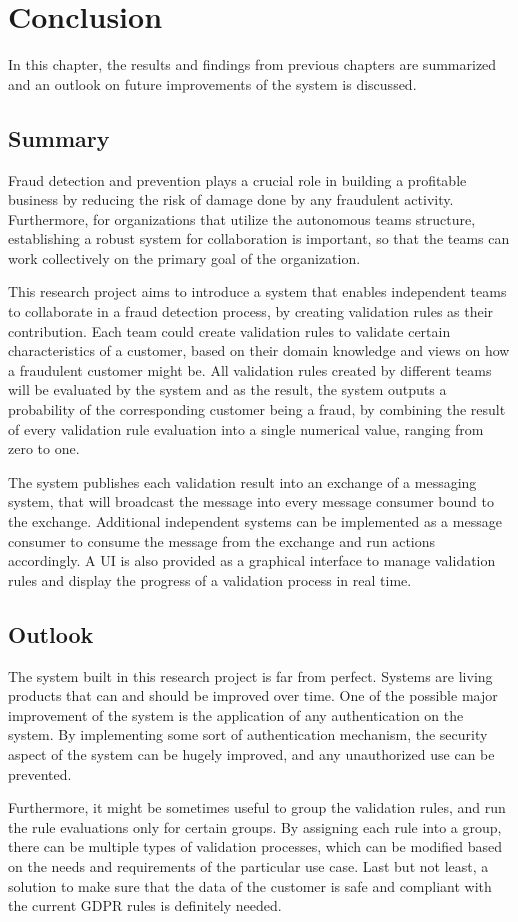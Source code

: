 \chapter{Conclusion}

  In this chapter, the results and findings from previous chapters are summarized and an outlook on future improvements of the system is discussed.

  \section{Summary}

    Fraud detection and prevention plays a crucial role in building a profitable business by reducing the risk of damage done by any fraudulent activity. Furthermore, for organizations that utilize the autonomous teams structure, establishing a robust system for collaboration is important, so that the teams can work collectively on the primary goal of the organization.

    This research project aims to introduce a system that enables independent teams to collaborate in a fraud detection process, by creating validation rules as their contribution. Each team could create validation rules to validate certain characteristics of a customer, based on their domain knowledge and views on how a fraudulent customer might be. All validation rules created by different teams will be evaluated by the system and as the result, the system outputs a probability of the corresponding customer being a fraud, by combining the result of every validation rule evaluation into a single numerical value, ranging from zero to one. 
    
    The system publishes each validation result into an exchange of a messaging system, that will broadcast the message into every message consumer bound to the exchange. Additional independent systems can be implemented as a message consumer to consume the message from the exchange and run actions accordingly. A UI is also provided as a  graphical interface to manage validation rules and display the progress of a validation process in real time. 
  
  \section{Outlook}

    The system built in this research project is far from perfect. Systems are living products that can and should be improved over time. One of the possible major improvement of the system is the application of any authentication on the system. By implementing some sort of authentication mechanism, the security aspect of the system can be hugely improved, and any unauthorized use can be prevented. 

    Furthermore, it might be sometimes useful to group the validation rules, and run the rule evaluations only for certain groups. By assigning each rule into a group, there can be multiple types of validation processes, which can be modified based on the needs and requirements of the particular use case. Last but not least, a solution to make sure that the data of the customer is safe and compliant with the current GDPR rules is definitely needed. 